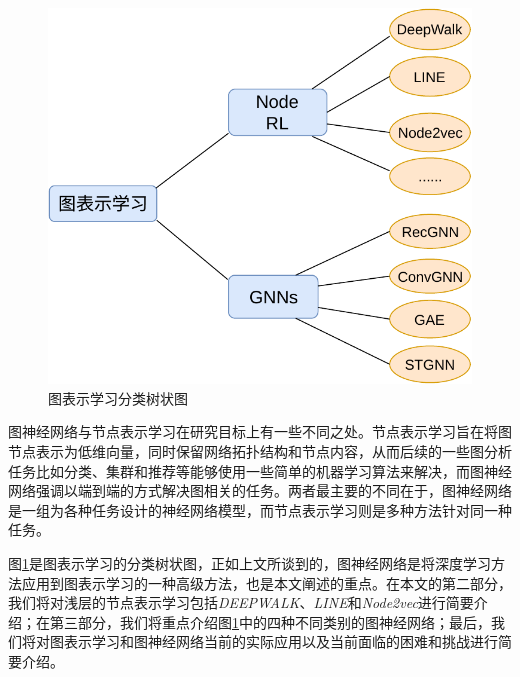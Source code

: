 \begin{figure}[!htbp]
  \centering
  \includegraphics[scale = 1]{Fig/gnn.pdf}
  \caption{图表示学习分类树状图}
  \label{fig:gnn}
\end{figure}

图神经网络与节点表示学习在研究目标上有一些不同之处。节点表示学习旨在将图节点表示为低维向量，同时保留网络拓扑结构和节点内容，从而后续的一些图分析任务比如分类、集群和推荐等能够使用一些简单的机器学习算法来解决，而图神经网络强调以端到端的方式解决图相关的任务。两者最主要的不同在于，图神经网络是一组为各种任务设计的神经网络模型，而节点表示学习则是多种方法针对同一种任务。

图\ref{fig:gnn}是图表示学习的分类树状图，正如上文所谈到的，图神经网络是将深度学习方法应用到图表示学习的一种高级方法，也是本文阐述的重点。在本文的第二部分，我们将对浅层的节点表示学习包括\emph{DEEPWALK}、\emph{LINE}和\emph{Node2vec}进行简要介绍；在第三部分，我们将重点介绍图\ref{fig:gnn}中的四种不同类别的图神经网络；最后，我们将对图表示学习和图神经网络当前的实际应用以及当前面临的困难和挑战进行简要介绍。

